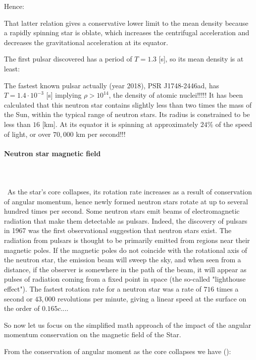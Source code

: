 	Hence:
	
	That latter relation gives a conservative lower limit to the mean density because a rapidly spinning star is oblate, which increases the centrifugal acceleration and decreases the gravitational acceleration at its equator.

	The first pulsar discovered has a period of $T=1.3$ [s], so its mean density is at least:
	
	The fastest known pulsar actually (year 2018), PSR J1748-2446ad, has $T=1.4\cdot 10^{-3}$ [s] implying $\rho>10^{14}$, the density of atomic nuclei!!!!! It has been calculated that this neutron star contains slightly less than two times the mass of the Sun, within the typical range of neutron stars. Its radius is constrained to be less than $16$ [km]. At its equator it is spinning at approximately $24\%$ of the speed of light, or over $70,000$ km per second!!!
	
	\paragraph{Neutron star magnetic field}\mbox{}\\\\\
	As the star's core collapses, its rotation rate increases as a result of conservation of angular momentum, hence newly formed neutron stars rotate at up to several hundred times per second. Some neutron stars emit beams of electromagnetic radiation that make them detectable as pulsars. Indeed, the discovery of pulsars in 1967 was the first observational suggestion that neutron stars exist. The radiation from pulsars is thought to be primarily emitted from regions near their magnetic poles. If the magnetic poles do not coincide with the rotational axis of the neutron star, the emission beam will sweep the sky, and when seen from a distance, if the observer is somewhere in the path of the beam, it will appear as pulses of radiation coming from a fixed point in space (the so-called "lighthouse effect"). The fastest rotation rate for a neutron star was a rate of $716$ times a second or $43,000$ revolutions per minute, giving a linear speed at the surface on the order of $0.165 c$....
	
	So now let us focus on the simplified math approach of the impact of the angular momentum conservation on the magnetic field of the Star. 
	
	From the conservation of angular moment as the core collapses we have ():
	
